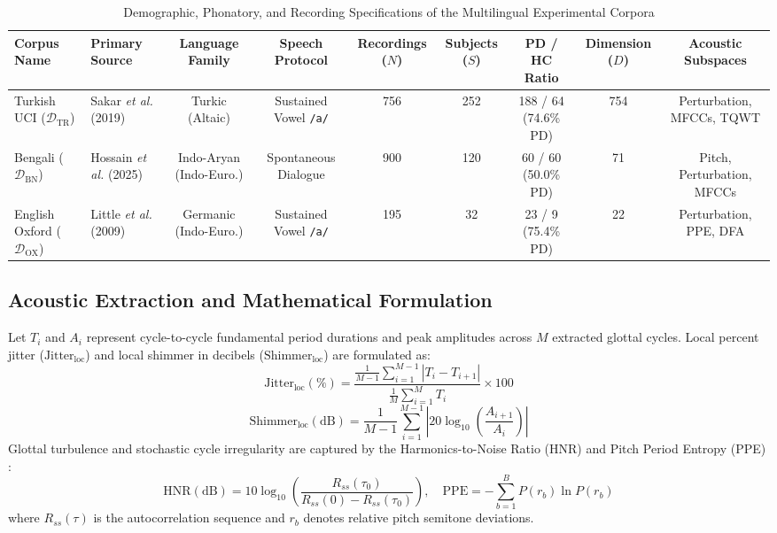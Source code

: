 \documentclass[journal,10pt,twoside]{IEEEtran}
\begin{document}
\begin{table}[t]
\caption{Demographic, Phonatory, and Recording Specifications of the Multilingual Experimental Corpora}
\label{tab:corpora}
\centering
\scriptsize
\begin{tabular}{lp{3.5cm}ccccccc}
\toprule
\textbf{Corpus Name} & \textbf{Primary Source} & \textbf{Language Family} & \textbf{Speech Protocol} & \textbf{Recordings ($N$)} & \textbf{Subjects ($S$)} & \textbf{PD / HC Ratio} & \textbf{Dimension ($D$)} & \textbf{Acoustic Subspaces} \\
\midrule
Turkish UCI ($\mathcal{D}_{\text{TR}}$) & Sakar \textit{et al.} (2019) \cite{ref1} & Turkic (Altaic) & Sustained Vowel \texttt{/a/} & 756 & 252 & 188 / 64 (74.6\% PD) & 754 & Perturbation, MFCCs, TQWT \\
Bengali ($\mathcal{D}_{\text{BN}}$) & Hossain \textit{et al.} (2025) \cite{ref5} & Indo-Aryan (Indo-Euro.) & Spontaneous Dialogue & 900 & 120 & 60 / 60 (50.0\% PD) & 71 & Pitch, Perturbation, MFCCs \\
English Oxford ($\mathcal{D}_{\text{OX}}$) & Little \textit{et al.} (2009) \cite{ref3} & Germanic (Indo-Euro.) & Sustained Vowel \texttt{/a/} & 195 & 32 & 23 / 9 (75.4\% PD) & 22 & Perturbation, PPE, DFA \\
\bottomrule
\end{tabular}
\end{table}

\subsection{Acoustic Extraction and Mathematical Formulation}
Let $T_i$ and $A_i$ represent cycle-to-cycle fundamental period durations and peak amplitudes across $M$ extracted glottal cycles. Local percent jitter ($\text{Jitter}_{\text{loc}}$) and local shimmer in decibels ($\text{Shimmer}_{\text{loc}}$) are formulated as:
\begin{equation}
\text{Jitter}_{\text{loc}}(\%) = \frac{\frac{1}{M-1}\sum_{i=1}^{M-1} |T_i - T_{i+1}|}{\frac{1}{M}\sum_{i=1}^{M} T_i} \times 100
\end{equation}
\begin{equation}
\text{Shimmer}_{\text{loc}}(\text{dB}) = \frac{1}{M-1}\sum_{i=1}^{M-1} \left|20\log_{10}\left(\frac{A_{i+1}}{A_i}\right)\right|
\end{equation}
Glottal turbulence and stochastic cycle irregularity are captured by the Harmonics-to-Noise Ratio (HNR) and Pitch Period Entropy (PPE) \cite{ref3}:
\begin{equation}
\text{HNR}(\text{dB}) = 10 \log_{10} \left( \frac{R_{ss}(\tau_0)}{R_{ss}(0) - R_{ss}(\tau_0)} \right), \quad \text{PPE} = -\sum_{b=1}^{B} P(r_b) \ln P(r_b)
\end{equation}
where $R_{ss}(\tau)$ is the autocorrelation sequence and $r_b$ denotes relative pitch semitone deviations.
\end{document}
